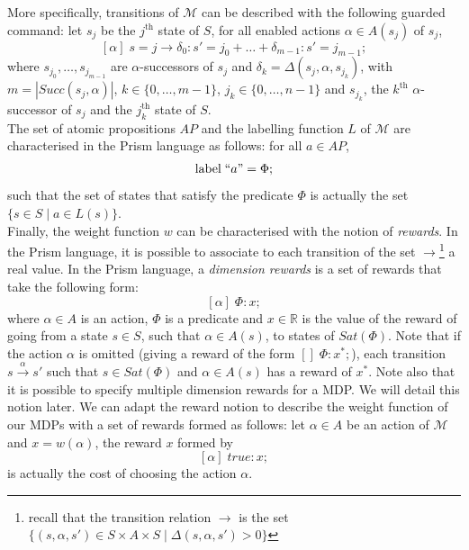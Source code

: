 More specifically, transitions of $\mathcal{M}$ can be described with the following guarded command:
let $s_j$ be the $j^{\text{th}}$ state of $S$, for all enabled actions $\alpha \in A(s_j)$ of $s_j$,
\[
  [\alpha] \; s=j \rightarrow \delta_0: s'=j_0 + \dots + \delta_{m-1}:  s'=j_{m-1};
\]
where $s_{j_0}, \dots, s_{j_{m-1}}$ are $\alpha$-successors of $s_j$ and $\delta_k = \Delta(s_j, \alpha, s_{j_k})$,
with  $m=|Succ(s_j,\alpha)|$, $k \in \{0, \dots, m-1\}$, $j_k \in \{0, \dots, n-1\}$ and $s_{j_k}$, the $k^\text{th}$ $\alpha$-successor of $s_j$ and the $j_k^\text{th}$ state of $S$. \\

The set of atomic propositions $AP$ and the labelling function $L$ of $\mathcal{M}$ are characterised in the Prism language as follows: for all $a \in AP$,
\[
  \text{label} \; ``a" = \Phi;
\]
such that the set of states that satisfy the predicate $\Phi$ is actually the set $\{ s \in S \; | \; a \in L(s) \}$. \\

%

Finally, the weight function $w$ can be characterised with the notion of \textit{rewards}. In the Prism language, it is possible to associate to each transition
of the set %
$\rightarrow$\footnote{recall that the transition relation $\rightarrow$ is the set $\{ (s, \alpha, s') \in S \times A \times S \; | \; \Delta(s, \alpha, s') > 0 \}$}
a real value. In the Prism language, a \textit{dimension rewards} is a set of rewards that take the following form:
\[
  [\alpha] \; \Phi: x;
\]
where $\alpha \in A$ is an action, $\Phi$ is a predicate and $x \in \mathbb{R}$
is the value of the reward of going from a state $s \in S$, such that $\alpha \in A(s)$, to states of $Sat(\Phi)$. Note that if the action $\alpha$ is omitted (giving a reward of the form $[]\; \Phi: x^*;$), each transition $s \xrightarrow{\,\alpha\,} s'$ such that $s \in Sat(\Phi)$ and $\alpha \in A(s)$
has a reward of $x^*$. Note also that it is possible to specify multiple dimension rewards for a MDP. We will detail this notion later.
We can adapt the reward notion to describe the weight function of our MDPs with a set of rewards formed as follows:
let $\alpha \in A$ be an action of $\mathcal{M}$ and $x = w(\alpha)$, the reward $x$ formed by
\[
  [\alpha] \; true: x;
\]
is actually the cost of choosing the action $\alpha$.


